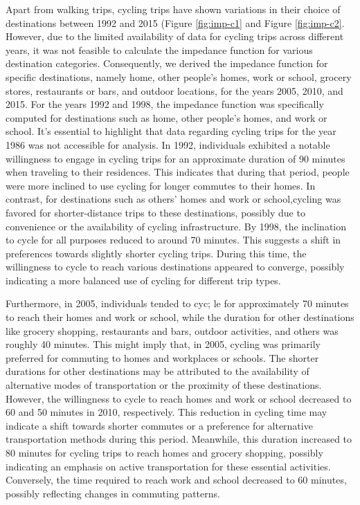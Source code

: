 \documentclass[
11pt, %
oneside, %
english, %
singlespacing, %
]{macthesis} %
\begin{document}
Apart from walking trips, cycling trips have shown variations in their choice of destinations between 1992 and 2015 (Figure \ref{fig:imp-c1} and Figure \ref{fig:imp-c2}. However, due to the limited availability of data for cycling trips across different years, it was not feasible to calculate the impedance function for various destination categories. Consequently, we derived the impedance function for specific destinations, namely home, other people's homes, work or school, grocery stores, restaurants or bars, and outdoor locations, for the years 2005, 2010, and 2015. For the years 1992 and 1998, the impedance function was specifically computed for destinations such as home, other people's homes, and work or school. It's essential to highlight that data regarding cycling trips for the year 1986 was not accessible for analysis. In 1992, individuals exhibited a notable willingness to engage in cycling trips for an approximate duration of 90 minutes when traveling to their residences. This indicates that during that period, people were more inclined to use cycling for longer commutes to their homes. In contrast, for destinations such as others' homes and work or school,cycling was favored for shorter-distance trips to these destinations, possibly due to convenience or the availability of cycling infrastructure. By 1998, the inclination to cycle for all purposes reduced to around 70 minutes. This suggests a shift in preferences towards slightly shorter cycling trips. During this time, the willingness to cycle to reach various destinations appeared to converge, possibly indicating a more balanced use of cycling for different trip types.

Furthermore, in 2005, individuals tended to cyc; le for approximately 70 minutes to reach their homes and work or school, while the duration for other destinations like grocery shopping, restaurants and bars, outdoor activities, and others was roughly 40 minutes. This might imply that, in 2005, cycling was primarily preferred for commuting to homes and workplaces or schools. The shorter durations for other destinations may be attributed to the availability of alternative modes of transportation or the proximity of these destinations. However, the willingness to cycle to reach homes and work or school decreased to 60 and 50 minutes in 2010, respectively. This reduction in cycling time may indicate a shift towards shorter commutes or a preference for alternative transportation methods during this period. Meanwhile, this duration increased to 80 minutes for cycling trips to reach homes and grocery shopping, possibly indicating an emphasis on active transportation for these essential activities. Conversely, the time required to reach work and school decreased to 60 minutes, possibly reflecting changes in commuting patterns.
\end{document}
